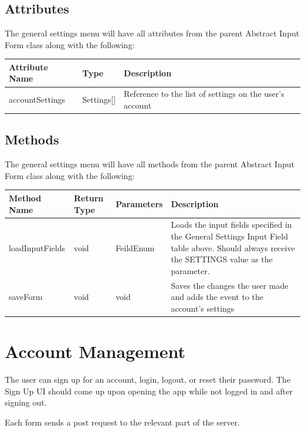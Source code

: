 \documentclass{scrreprt}
\begin{document}
\subsection{Attributes}

The general settings menu will have all attributes from the parent Abstract Input Form class along with the following:

\begin{center}
\begin{longtable}{ | p{3cm} | p{3cm} | p{9cm} | }
\hline
\textbf{Attribute Name} & \textbf{Type} & \textbf{Description} \\
\hline
accountSettings & Settings[] & Reference to the list of settings on the user's account \\
\hline
\end{longtable}
\end{center}

\subsection{Methods}

The general settings menu will have all methods from the parent Abstract Input Form class along with the following:

\begin{center}
\begin{longtable}{ | p{3cm} | p{2cm} | p{2cm} | p{8cm} | }
\hline
\textbf{Method Name} & \textbf{Return Type} & \textbf{Parameters} & \textbf{Description} \\
\hline
loadInputFields & void & FeildEnum & Loads the input fields specified in the General Settings Input Field table above. Should always receive the SETTINGS value as the parameter.\\
\hline
saveForm & void & void & Saves the changes the user made and adds the event to the account's settings \\
\hline
\end{longtable}
\end{center}

\section{Account Management}

The user can sign up for an account, login, logout, or reset their password.  The Sign Up UI should come up upon opening the app while not logged in and after signing out.

Each form sends a post request to the relevant part of the server.
\end{document}
